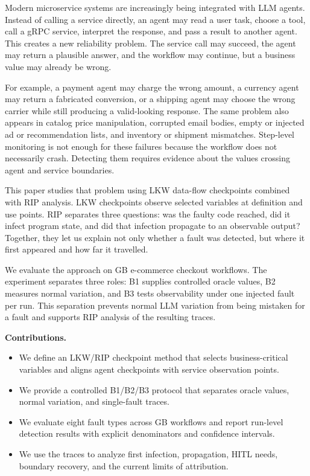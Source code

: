 \documentclass[sigconf,review,anonymous,balance=false]{acmart}
\begin{document}
Modern microservice systems are increasingly being integrated with LLM agents.
Instead of calling a service directly, an agent may read a user task, choose a
tool, call a gRPC service, interpret the response, and pass a result to another
agent. This creates a new reliability problem. The service call may succeed,
the agent may return a plausible answer, and the workflow may continue, but a
business value may already be wrong.

For example, a payment agent may charge the wrong amount, a currency agent may
return a fabricated conversion, or a shipping agent may choose the wrong carrier
while still producing a valid-looking response. The same problem also appears in
catalog price manipulation, corrupted email bodies, empty or injected ad or
recommendation lists, and inventory or shipment mismatches. Step-level
monitoring is not enough for these failures because the workflow does not
necessarily crash. Detecting them requires evidence about the values crossing
agent and service boundaries.

This paper studies that problem using LKW data-flow checkpoints combined with
RIP analysis. LKW checkpoints observe selected variables at definition and use
points. RIP separates three questions: was the faulty code reached, did it
infect program state, and did that infection propagate to an observable output?
Together, they let us explain not only whether a fault was detected, but where
it first appeared and how far it travelled.

We evaluate the approach on GB e-commerce checkout workflows.
The experiment separates three roles: B1 supplies controlled oracle values, B2
measures normal variation, and B3 tests observability under one injected fault
per run. This separation prevents normal LLM variation from being mistaken for
a fault and supports RIP analysis of the resulting traces.

\textbf{Contributions.}
\begin{itemize}
  \item We define an LKW/RIP checkpoint method that selects business-critical
        variables and aligns agent checkpoints with service observation points.
  \item We provide a controlled B1/B2/B3 protocol that separates oracle values,
        normal variation, and single-fault traces.
  \item We evaluate eight fault types across GB workflows and report
        run-level detection results with explicit denominators and confidence
        intervals.
  \item We use the traces to analyze first infection, propagation, HITL needs,
        boundary recovery, and the current limits of attribution.
\end{itemize}
\end{document}
